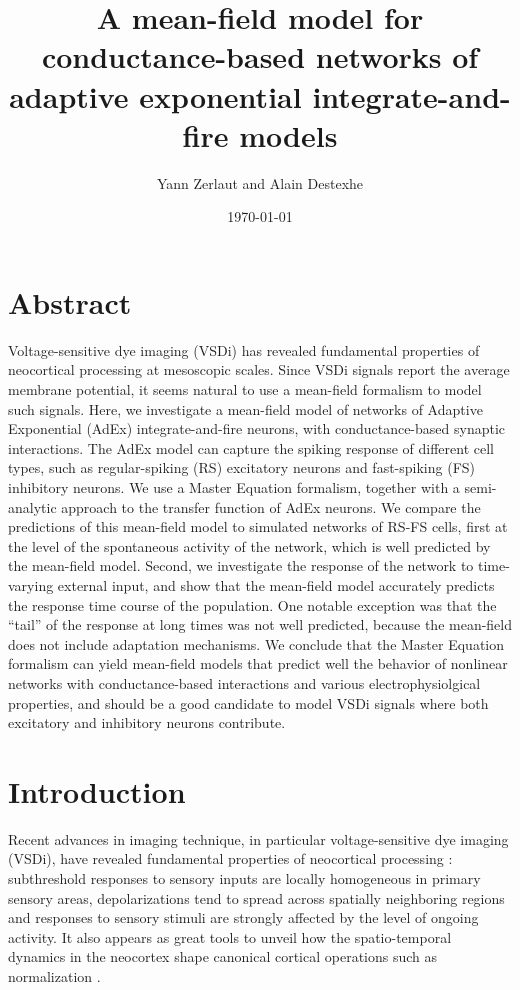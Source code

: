 \documentclass[8pt, colorlinks, a4paper]{article}
\author{Yann Zerlaut and Alain Destexhe}
\date{\today}
\title{A mean-field model for conductance-based networks of adaptive
  exponential integrate-and-fire models}
\newcommand{\yann}[1]{{\textcolor{green}{#1}}}
\newcommand{\alain}[1]{{\textcolor{blue}{#1}}}
\newcommand{\remark}[1]{{\textcolor{red}{#1}}}
\begin{document}
\maketitle

\linenumbers


\section{Abstract}
\label{sec-1}
\bfseries

Voltage-sensitive dye imaging (VSDi) has revealed fundamental
properties of neocortical processing at mesoscopic scales.  Since VSDi
signals report the average membrane potential, it seems natural to use
a mean-field formalism to model such signals.  Here, we investigate a
mean-field model of networks of Adaptive Exponential (AdEx)
integrate-and-fire neurons, with conductance-based synaptic
interactions.  The AdEx model can capture the spiking response of
different cell types, such as regular-spiking (RS) excitatory neurons
and fast-spiking (FS) inhibitory neurons.  We use a Master Equation
formalism, together with a semi-analytic approach to the transfer
function of AdEx neurons.  We compare the predictions of this
mean-field model to simulated networks of RS-FS cells, first at the
level of the spontaneous activity of the network, which is well
predicted by the mean-field model.  Second, we investigate the
response of the network to time-varying external input, and show that
the mean-field model accurately predicts the response time course of
the population.  One notable exception was that the ``tail'' of the
response at long times was not well predicted, because the mean-field
does not include adaptation mechanisms.  We conclude that the Master
Equation formalism can yield mean-field models that predict well the
behavior of nonlinear networks with conductance-based interactions and
various electrophysiolgical properties, and should be a good candidate
to model VSDi signals where both excitatory and inhibitory neurons
contribute.

\normalfont

\section{Introduction}
\label{sec-2}
\normalfont

Recent advances in imaging technique, in particular voltage-sensitive
dye imaging (VSDi), have revealed fundamental properties of
neocortical processing
\cite{Arieli1996,Contreras2001,Petersen2001,Ferezou2006,Civillico2012}:
subthreshold responses to sensory inputs are locally homogeneous in
primary sensory areas, depolarizations tend to spread across spatially
neighboring regions and responses to sensory stimuli are strongly
affected by the level of ongoing activity. It also appears as great
tools to unveil how the spatio-temporal dynamics in the neocortex
shape canonical cortical operations such as normalization
\cite{Reynaud2012}.
\end{document}
